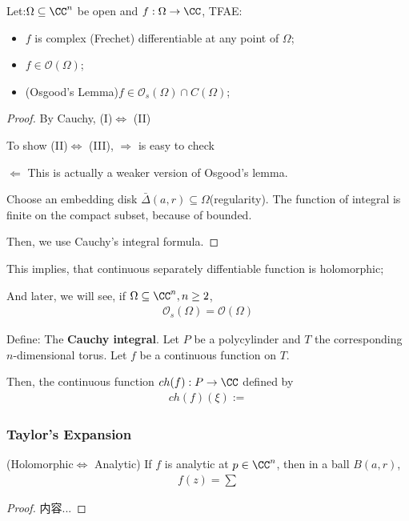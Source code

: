 \documentclass[Total.tex]{subfiles}
\begin{document}
			\begin{corollary}
				Let:$\Omega\subseteq \CC^n$ be open and $f:\Omega\rightarrow \CC$, TFAE:
				\begin{itemize}
					\item $f$ is complex (Frechet) differentiable at any point of $\Omega$;
					\item $f\in \mathcal{O}(\Omega)$;
					\item (Osgood's Lemma)$f\in \mathcal{O}_s(\Omega)\cap C(\Omega)$;
				\end{itemize}
			\end{corollary}
			\begin{proof}
				By Cauchy, (I)$\Leftrightarrow$ (II)
				
				To show (II)$\Leftrightarrow$ (III), $\Rightarrow$ is easy to check
				
				$\Leftarrow$ This is actually a weaker version of Osgood's lemma. 
				
				Choose an embedding disk $\bar{\Delta}(a,r)\subseteq \Omega$(regularity). The function of integral is finite on the compact subset, because of bounded. 
				
				Then, we use Cauchy's integral formula. 
			\end{proof}
			
			
			This implies, that continuous separately diffentiable function is holomorphic;
			
			And later, we will see, if $\Omega\subseteq \CC^n,n\geq 2$,
			\begin{gather*}
				\mathcal{O}_s(\Omega)=\mathcal{O}(\Omega)
			\end{gather*}
			
			\begin{Def}
				Define: The \textbf{Cauchy integral}. Let $P$ be a polycylinder and $T$ the corresponding $n$-dimensional torus. Let $f$ be a continuous function on $T$.
				
				Then, the continuous function $ch(f):P\rightarrow \CC$ defined by
				\begin{gather*}
					ch(f)(\xi):=
				\end{gather*}
			\end{Def}
		
		\subsubsection{Taylor's Expansion}
		\begin{proposition}
			(Holomorphic$\Leftrightarrow$ Analytic) If $f$ is analytic at $p\in \CC^n$, then in a ball $B(a,r)$,
			\begin{gather*}
				f(z)=\sum 
			\end{gather*}
		\end{proposition}
		\begin{proof}
			内容...
		\end{proof}
\end{document}
